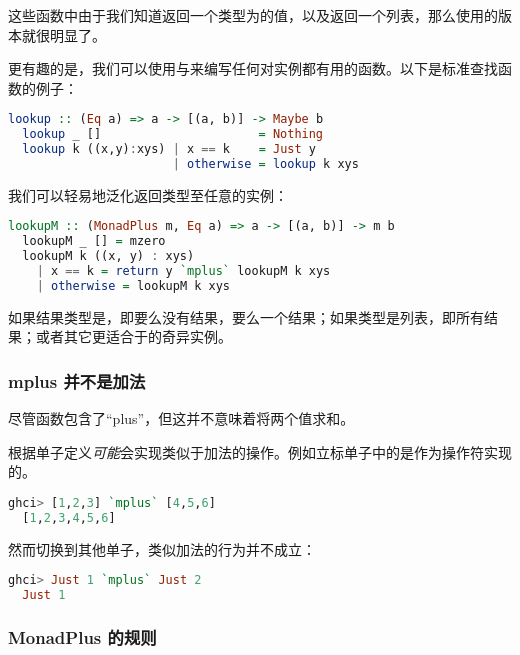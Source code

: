 \documentclass[./main.tex]{subfiles}
\begin{document}
这些函数中由于我们知道返回一个类型为的值，以及返回一个列表，那么使用的版本就很明显了。

更有趣的是，我们可以使用与来编写任何对实例都有用的函数。以下是标准查找函数的例子：

\begin{lstlisting}[language=Haskell]
  lookup :: (Eq a) => a -> [(a, b)] -> Maybe b
  lookup _ []                      = Nothing
  lookup k ((x,y):xys) | x == k    = Just y
                       | otherwise = lookup k xys
\end{lstlisting}

我们可以轻易地泛化返回类型至任意的实例：

\begin{lstlisting}[language=Haskell]
  lookupM :: (MonadPlus m, Eq a) => a -> [(a, b)] -> m b
  lookupM _ [] = mzero
  lookupM k ((x, y) : xys)
    | x == k = return y `mplus` lookupM k xys
    | otherwise = lookupM k xys
\end{lstlisting}

如果结果类型是，即要么没有结果，要么一个结果；如果类型是列表，即所有结果；或者其它更适合于的奇异实例。

\subsubsection*{mplus 并不是加法}

尽管函数包含了“plus”，但这并不意味着将两个值求和。

根据单子定义\textit{可能}会实现类似于加法的操作。例如立标单子中的是作为\acode{(++)}操作符实现的。

\begin{lstlisting}[language=Haskell]
  ghci> [1,2,3] `mplus` [4,5,6]
  [1,2,3,4,5,6]
\end{lstlisting}

然而切换到其他单子，类似加法的行为并不成立：

\begin{lstlisting}[language=Haskell]
  ghci> Just 1 `mplus` Just 2
  Just 1
\end{lstlisting}

\subsubsection*{MonadPlus 的规则}
\end{document}
